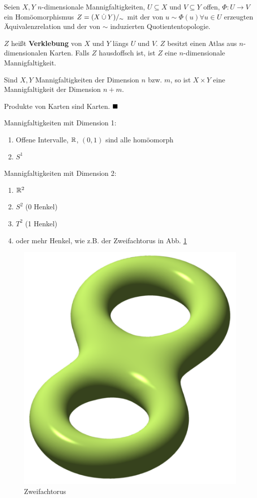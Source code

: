 \begin{definition}
    Seien $X, Y$ $n$-dimensionale Mannigfaltigkeiten, $U \subseteq X$
    und $V \subseteq Y$ offen, $\Phi: U \rightarrow V$ ein Homöomorphismus
    $Z = (X \mathbin{\dot{\cup}} Y) /_\sim$ mit der von $u \sim \Phi(u) \forall{u \in U}$
    erzeugten Äquivalenzrelation und der von $\sim$ induzierten 
    Quotiententopologie.

    $Z$ heißt \textbf{Verklebung} von $X$ und $Y$ längs $U$ und $V$.
    $Z$ besitzt einen Atlas aus $n$-dimensionalen Karten.
    Falls $Z$ hausdoffsch ist, ist $Z$ eine $n$-dimensionale 
    Mannigfaltigkeit.
\end{definition}

\begin{korollar}
    Sind $X, Y$ Mannigfaltigkeiten der Dimension $n$ bzw. $m$, so ist
    $X \times Y$ eine Mannigfaltigkeit der Dimension $n+m$.
\end{korollar}

\begin{beweis}
    Produkte von Karten sind Karten. $\qed$
\end{beweis}

\begin{beispiel}
    Mannigfaltigkeiten mit Dimension 1:
    \begin{enumerate}[label=\arabic*)]
        \item Offene Intervalle, $\mathbb{R}$, $(0,1)$ sind alle homöomorph
        \item $S^1$
    \end{enumerate}

    Mannigfaltigkeiten mit Dimension 2:
    \begin{enumerate}[label=\arabic*)]
        \item $\mathbb{R}^2$
        \item $S^2$ (0 Henkel)
        \item $T^2$ (1 Henkel)
        \item oder mehr Henkel, wie z.B. der Zweifachtorus in Abb. \ref{fig:double-torus}
    \end{enumerate}

    \begin{figure}
        \centering
        \includegraphics[width=0.2\linewidth, keepaspectratio]{figures/Double-torus-illustration.png}
        \caption{Zweifachtorus}
        \label{fig:double-torus}
    \end{figure}
\end{beispiel}

